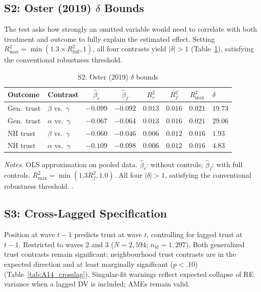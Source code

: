 \documentclass[12pt, a4paper]{article}
\newcommand{\tablenote}[1]{\vspace{4pt}\par\footnotesize\textit{Notes.} #1}
\begin{document}
\subsection{S2: Oster (2019) $\delta$ Bounds}
\label{sec:s2}

The \citet{oster2019unobservable} test asks how strongly an omitted variable
would need to correlate with both treatment and outcome to fully explain the
estimated effect. Setting $R^2_{\max} = \min(1.3 \times R^2_{\text{full}},
1)$, all four contrasts yield $|\delta| > 1$
(Table~\ref{tab:A13_oster}), satisfying the conventional robustness threshold.

\begin{table}[H]
\centering
\caption{S2: Oster (2019) $\delta$ bounds}
\label{tab:A13_oster}
\small
\begin{tabular}{llcccccl}
\hline\hline
  Outcome & Contrast & $\hat{\beta}_r$ & $\hat{\beta}_f$ &
  $R^2_r$ & $R^2_f$ & $R^2_{\max}$ & $\delta$ \\
\hline
  Gen.\ trust   & $\beta$ vs.\ $\gamma$ & $-0.099$ & $-0.092$ & $0.013$ & $0.016$ & $0.021$ & $19.73$  \\
  Gen.\ trust   & $\alpha$ vs.\ $\gamma$ & $-0.067$ & $-0.064$ & $0.013$ & $0.016$ & $0.021$ & $29.06$ \\
  NH trust & $\beta$ vs.\ $\gamma$ & $-0.060$ & $-0.046$ & $0.006$ & $0.012$ & $0.016$ & $1.93$ \\
  NH trust & $\alpha$ vs.\ $\gamma$ & $-0.109$ & $-0.098$ & $0.006$ & $0.012$ & $0.016$ & $4.83$  \\
\hline\hline
\end{tabular}
\tablenote{OLS approximation on pooled data. $\hat{\beta}_r$: without controls;
$\hat{\beta}_f$: with full controls. $R^2_{\max} = \min(1.3 R^2_f, 1.0)$.
All four $|\delta| > 1$, satisfying the conventional robustness threshold.
\citep{oster2019unobservable}.}
\end{table}

\subsection{S3: Cross-Lagged Specification}
\label{sec:s3}

Position at wave $t-1$ predicts trust at wave $t$, controlling for lagged
trust at $t-1$. Restricted to waves 2 and 3 ($N = 2{,}594$;
$n_{\text{id}} = 1{,}297$). Both generalized trust contrasts remain
significant; neighbourhood trust contrasts are in the expected direction and
at least marginally significant ($p < .10$)
(Table~\ref{tab:A14_crosslag}). Singular-fit warnings reflect expected
collapse of RE variance when a lagged DV is included; AMEs remain valid.
\end{document}
